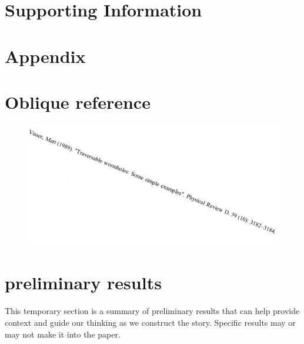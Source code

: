 \documentclass{article}
\begin{document}
\section{Supporting Information}

\section{Appendix}



\section{Oblique reference}

\begin{figure}[H]
	\includegraphics[scale=0.5]{../figures/oblique_reference.png}
\end{figure}

\section{preliminary results}
This temporary section is a summary of preliminary results that can help provide context and guide our thinking as we construct the story.  Specific results may or may not make it into the paper.
\end{document}
